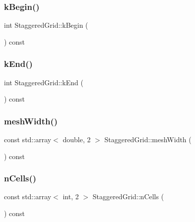 \mbox{\label{classStaggeredGrid_a7bb93be87d23ec6dbba5e082f4b24757}} 
\subsubsection{\texorpdfstring{kBegin()}{kBegin()}}
{\footnotesize\ttfamily int Staggered\+Grid\+::k\+Begin (\begin{DoxyParamCaption}{ }\end{DoxyParamCaption}) const}

\mbox{\label{classStaggeredGrid_ae6e4fdf936f14934a0995cef74042fc1}} 
\subsubsection{\texorpdfstring{kEnd()}{kEnd()}}
{\footnotesize\ttfamily int Staggered\+Grid\+::k\+End (\begin{DoxyParamCaption}{ }\end{DoxyParamCaption}) const}

\mbox{\label{classStaggeredGrid_a330856d4efe952771daf0753ef84068e}} 
\subsubsection{\texorpdfstring{meshWidth()}{meshWidth()}}
{\footnotesize\ttfamily const std\+::array$<$ double, 2 $>$ Staggered\+Grid\+::mesh\+Width (\begin{DoxyParamCaption}{ }\end{DoxyParamCaption}) const}

\mbox{\label{classStaggeredGrid_af37816ccb2c46e4a514dedac261897bf}} 
\subsubsection{\texorpdfstring{nCells()}{nCells()}}
{\footnotesize\ttfamily const std\+::array$<$ int, 2 $>$ Staggered\+Grid\+::n\+Cells (\begin{DoxyParamCaption}{ }\end{DoxyParamCaption}) const}

